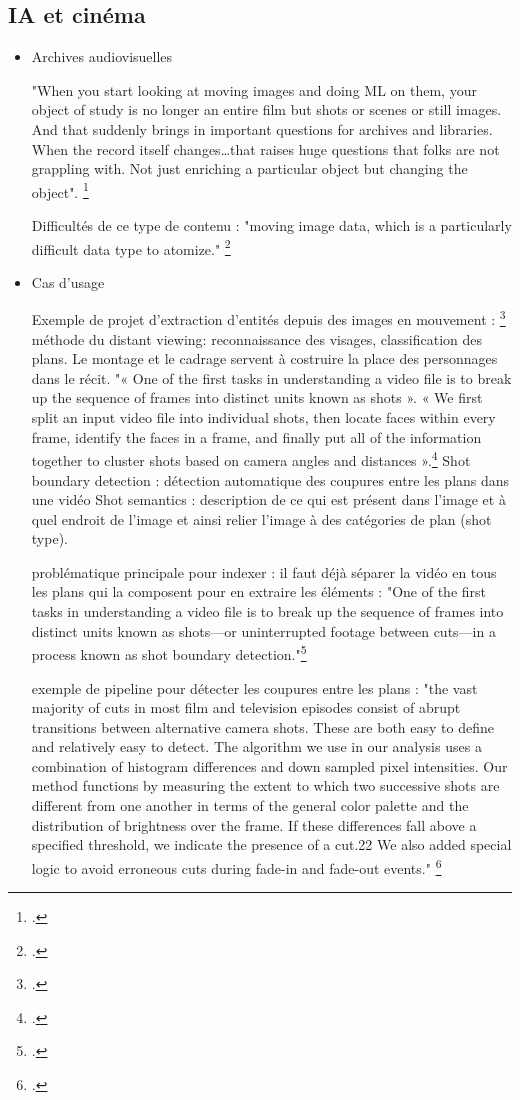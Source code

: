 \subsection{IA et cinéma}

\begin{itemize}
	\item Archives audiovisuelles  
	
	"When you start looking at moving images and doing ML on them, your object of study
	is no longer an entire film but shots or scenes or still images. And that suddenly brings
	in important questions for archives and libraries. When the record itself changes…that
	raises huge questions that folks are not grappling with. Not just enriching a particular
	object but changing the object". 
	\footcite{cordell}
	
	Difficultés de ce type de contenu : 
	"moving image data, which is a particularly difficult data type to atomize."
	\footcite{cordell}
	
	\item Cas d'usage 
	
	Exemple de projet d'extraction d'entités depuis des images en mouvement : \footcite{arnold2019}
	méthode du distant viewing: reconnaissance des visages, classification des plans. Le montage et le cadrage servent à costruire la place des personnages dans le récit. 
	"« One of the first tasks in understanding a video file is to break up the sequence of frames into distinct units known as shots ».
	« We first split an input video file into individual shots, then locate faces within every frame, identify the faces in a frame, and finally put all of the information together to cluster shots based on camera angles and distances ».\footcite{arnold2019} 
	Shot boundary detection : détection automatique des coupures entre les plans dans une vidéo 
	Shot semantics : description de ce qui est présent dans l'image et à quel endroit de l'image et ainsi relier l'image à des catégories de plan (shot type).
	
	problématique principale pour indexer : il faut déjà séparer la vidéo en tous les plans qui la composent pour en extraire les éléments : 
	"One of the first tasks in understanding a video file is to break up the sequence of frames into distinct units known as shots—or uninterrupted footage between
	cuts—in a process known as shot boundary detection."\footcite{arnold2019}
	
	exemple de pipeline pour détecter les coupures entre les plans : 
	"the vast majority of cuts in most film and television
	episodes consist of abrupt transitions between alternative camera shots. These are both easy to define and relatively easy to detect. The algorithm we use in our analysis uses a combination of histogram differences and down sampled pixel intensities. Our method functions by measuring the extent to which two successive shots are different from one another in terms of the general color palette and the distribution of brightness over the frame. If these differences fall above a specified threshold, we indicate the presence of a cut.22 We also added special logic to avoid erroneous cuts during fade-in and fade-out events." \footcite{arnold2019}
	

\end{itemize}
